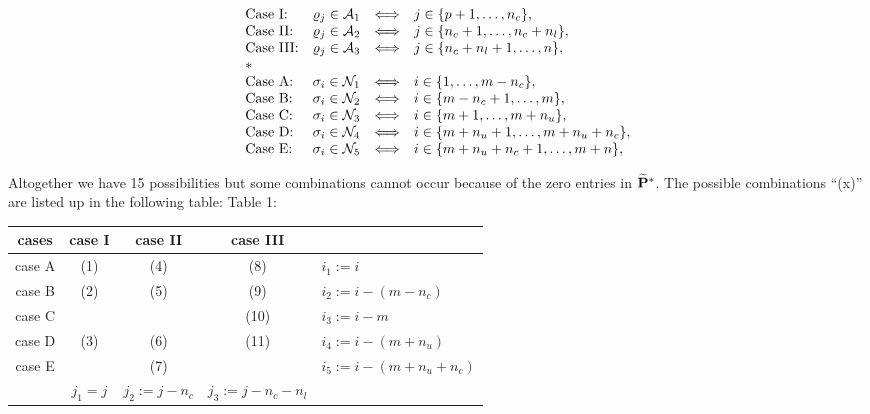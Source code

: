 \[
\ba{.}{lccl}
\mbox{Case I:} & \rho _j \in \A_1 &\Longleftrightarrow &j \in
\{p+1, \ldots,n_c\}, \\
%
\mbox{Case II:} & \rho _j \in \A_2 &\Longleftrightarrow &j \in
\{n_c+1, \ldots,n_c + n_l\}, \\
%
\mbox{Case III:} & \rho _j \in \A_3 &\Longleftrightarrow &j \in
\{n_c + n_l +1, \ldots,n\}, \\
%
*\hfill\\
\mbox{Case A:} & \sigma _i \in \N_1 &\Longleftrightarrow &i \in
\{1, \ldots, m - n_c\}, \\
%
\mbox{Case B:} & \sigma _i \in \N_2 &\Longleftrightarrow &i \in
\{m - n_c +1, \ldots,m\}, \\
%
\mbox{Case C:} & \sigma _i \in \N_3 &\Longleftrightarrow &i \in
\{m + 1, \ldots, m + n_u\}, \\
%
\mbox{Case D:} & \sigma _i \in \N_4 &\Longleftrightarrow &i \in
\{m + n_u + 1, \ldots, m + n_u + n_c\}, \\
%
\mbox{Case E:} & \sigma _i \in \N_5 &\Longleftrightarrow &i \in
\{m + n_u + n_c + 1, \ldots, m + n\},
\ea{.}
\]
\par
Altogether we have 15 possibilities
but some combinations cannot occur because of the zero entries in $\widetilde{{\bf
P}}^*$. The possible combinations ``(x)'' are listed up in the following
table:
\newpage
Table 1:
\begin{center}
\begin{tabular}{|c|c|c|c|l|} \hline
 cases          &  case I    &  case II     &  case III  &       \\ \hline
 case A         &   (1)      &  (4)         &  (8)       &  $i_1 := i$  \\
                                                                    \hline
 case B         &   (2)      &  (5)         &  (9)       &
                                          $i_2 := i - (m - n_c)$  \\ \hline
 case C         &            &              &  (10)      &
                                          $i_3 := i - m$          \\ \hline
 case D         &   (3)      &  (6)         &  (11)      &
                                          $i_4 := i - (m + n_u)$   \\ \hline
 case E         &            &  (7)         &            &
                                 $ i_5  := i - (m + n_u + n_c)$    \\ \hline
                &   $j_1 = j$      & $j_2:=j-n_c$  &$j_3:=j-n_c-n_l$ &
\\ \hline \end{tabular}
\end{center}
